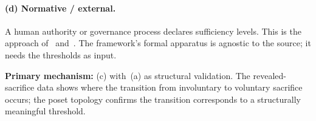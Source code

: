 \paragraph{(d) Normative / external.}
A human authority or governance process declares sufficiency
levels.  This is the approach of~\citet{sen1999development}
and~\citet{nussbaum2011creating}.  The framework's formal
apparatus is agnostic to the source; it needs the thresholds as
input.

\medskip\noindent
\textbf{Primary mechanism:} (c) with~(a) as structural
validation.  The revealed-sacrifice data shows where the
transition from involuntary to voluntary sacrifice occurs; the
poset topology confirms the transition corresponds to a
structurally meaningful threshold.
